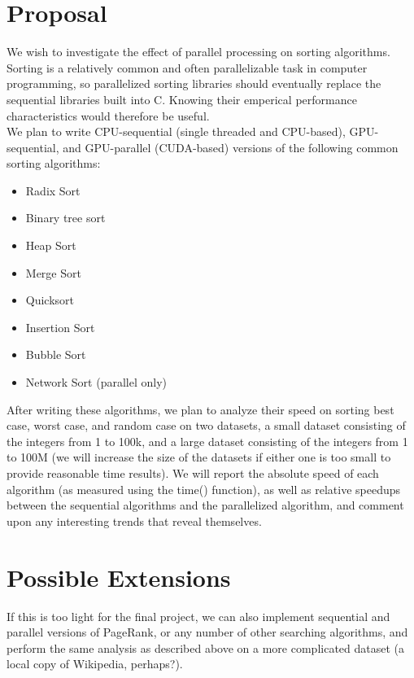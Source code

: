 \documentclass{article}
\begin{document}
\maketitle

\section{Proposal}

We wish to investigate the effect of parallel processing on sorting algorithms.  Sorting is a relatively common and often parallelizable task in computer programming, so parallelized sorting libraries should eventually replace the sequential libraries built into C.  Knowing their emperical performance characteristics would therefore be useful.\\

We plan to write CPU-sequential (single threaded and CPU-based), GPU-sequential, and GPU-parallel (CUDA-based) versions of the following common sorting algorithms:

\begin{itemize}
  \setlength{\itemsep}{0pt}
  \setlength{\parskip}{0pt}
  \item Radix Sort
  \item Binary tree sort
  \item Heap Sort
  \item Merge Sort
  \item Quicksort
  \item Insertion Sort
  \item Bubble Sort
  \item Network Sort (parallel only)
\end{itemize}

After writing these algorithms, we plan to analyze their speed on sorting best case, worst case, and random case on two datasets, a small dataset consisting of the integers from 1 to 100k, and a large dataset consisting of the integers from 1 to 100M (we will increase the size of the datasets if either one is too small to provide reasonable time results).  We will report the absolute speed of each algorithm (as measured using the time() function), as well as relative speedups between the sequential algorithms and the parallelized algorithm, and comment upon any interesting trends that reveal themselves.

\section{Possible Extensions}

If this is too light for the final project, we can also implement sequential and parallel versions of PageRank, or any number of other searching algorithms, and perform the same analysis as described above on a more complicated dataset (a local copy of Wikipedia, perhaps?).
\end{document}
